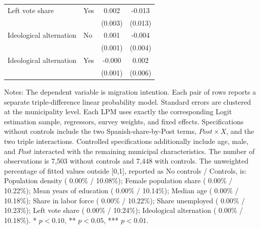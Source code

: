 \begin{table}[!htbp]
\begin{tabular}{llcc}
Left vote share & Yes & 0.002 & -0.013 \\
 & & (0.003) & (0.013) \\
\addlinespace
Ideological alternation & No & 0.001 & -0.004 \\
 & & (0.001) & (0.004) \\
Ideological alternation & Yes & -0.000 & 0.002 \\
 & & (0.001) & (0.006) \\
\hline
\end{tabular}
\par\vspace{1.5mm}
\begin{minipage}{\textwidth}
\footnotesize Notes: The dependent variable is migration intention. Each pair of rows reports a separate triple-difference linear probability model. Standard errors are clustered at the municipality level. Each LPM uses exactly the corresponding Logit estimation sample, regressors, survey weights, and fixed effects. Specifications without controls include the two Spanish-share-by-Post terms, \(Post \times X\), and the two triple interactions. Controlled specifications additionally include age, male, and \(Post\) interacted with the remaining municipal characteristics. The number of observations is        7,503 without controls and        7,448 with controls. The unweighted percentage of fitted values outside [0,1], reported as No controls / Controls, is: Population density ( 0.00\% / 10.08\%); Female population share ( 0.00\% / 10.22\%); Mean years of education ( 0.00\% / 10.14\%); Median age ( 0.00\% / 10.18\%); Share in labor force ( 0.00\% / 10.22\%); Share unemployed ( 0.00\% / 10.23\%); Left vote share ( 0.00\% / 10.24\%); Ideological alternation ( 0.00\% / 10.18\%). * \(p<0.10\), ** \(p<0.05\), *** \(p<0.01\).
\end{minipage}
\end{table}
